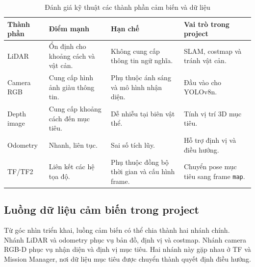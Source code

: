 \begin{table}[H]
    \centering
    \caption{Đánh giá kỹ thuật các thành phần cảm biến và dữ liệu}
    \label{tab:sensor-assessment}
    \renewcommand{\arraystretch}{1.25}
    \small
    \begin{tabularx}{\textwidth}{|>{\raggedright\arraybackslash}p{}|>{\raggedright\arraybackslash}p{}|>{\raggedright\arraybackslash}p{}|>{\raggedright\arraybackslash}X|}
        \hline
        \textbf{Thành phần} & \textbf{Điểm mạnh} & \textbf{Hạn chế} & \textbf{Vai trò trong project} \\
        \hline
        LiDAR & Ổn định cho khoảng cách và vật cản. & Không cung cấp thông tin ngữ nghĩa. & SLAM, costmap và tránh vật cản. \\
        \hline
        Camera RGB & Cung cấp hình ảnh giàu thông tin. & Phụ thuộc ánh sáng và mô hình nhận diện. & Đầu vào cho YOLOv8n. \\
        \hline
        Depth image & Cung cấp khoảng cách đến mục tiêu. & Dễ nhiễu tại biên vật thể. & Tính vị trí 3D mục tiêu. \\
        \hline
        Odometry & Nhanh, liên tục. & Sai số tích lũy. & Hỗ trợ định vị và điều hướng. \\
        \hline
        TF/TF2 & Liên kết các hệ tọa độ. & Phụ thuộc đồng bộ thời gian và cấu hình frame. & Chuyển pose mục tiêu sang frame \texttt{map}. \\
        \hline
    \end{tabularx}
\end{table}

\subsection{Luồng dữ liệu cảm biến trong project}
\label{subsec:sensor-data-flow}

Từ góc nhìn triển khai, luồng cảm biến có thể chia thành hai nhánh chính. Nhánh LiDAR và odometry phục vụ bản đồ, định vị và costmap. Nhánh camera RGB-D phục vụ nhận diện và định vị mục tiêu. Hai nhánh này gặp nhau ở TF và Mission Manager, nơi dữ liệu mục tiêu được chuyển thành quyết định điều hướng.

